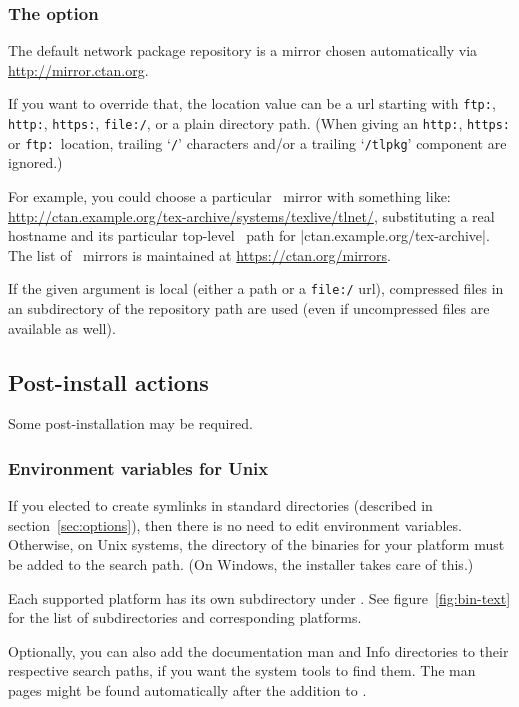 \documentclass{article}
\begin{document}
\subsubsection{The  option}
\label{sec:location}

The default network package repository is a \CTAN{} mirror chosen
automatically via \url{http://mirror.ctan.org}.

If you want to override that, the location value can be a url
starting with \texttt{ftp:}, \texttt{http:}, \texttt{https:},
\texttt{file:/}, or a plain directory path.  (When giving an
\texttt{http:}, \texttt{https:} or \texttt{ftp:}\ location, trailing
`\texttt{/}' characters and/or a trailing `\texttt{/tlpkg}'
component are ignored.)

For example, you could choose a particular \CTAN\ mirror with something
like: \url{http://ctan.example.org/tex-archive/systems/texlive/tlnet/},
substituting a real hostname and its particular top-level \CTAN\ path
for |ctan.example.org/tex-archive|.  The list of \CTAN\ mirrors is
maintained at \url{https://ctan.org/mirrors}.

If the given argument is local (either a path or a \texttt{file:/} url),
compressed files in an  subdirectory of the repository
path are used (even if uncompressed files are available as well).


\subsection{Post-install actions}
\label{sec:postinstall}

Some post-installation may be required.

\subsubsection{Environment variables for Unix}
\label{sec:env}

If you elected to create symlinks in standard directories (described in
section~\ref{sec:options}), then there is no need to edit environment
variables.  Otherwise, on Unix systems, the directory of the binaries
for your platform must be added to the search path.  (On Windows, the
installer takes care of this.)

Each supported platform has its own subdirectory under
. See figure~\ref{fig:bin-text} for the list of
subdirectories and corresponding platforms.

Optionally, you can also add the documentation man and Info directories
to their respective search paths, if you want the system tools to find
them.  The man pages might be found automatically after the addition to
.
\end{document}
